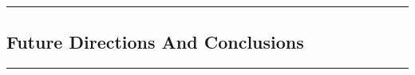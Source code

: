{\color{gray}\hrule}
\begin{center}
\section{Future Directions And Conclusions}
\bigskip
\end{center}
{\color{gray}\hrule}
\vspace{0.5cm}
\lipsum[1-2]
